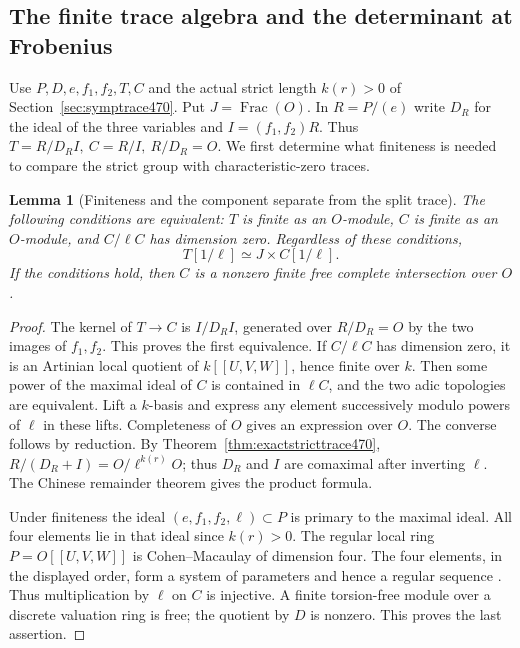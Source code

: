 \documentclass[a4paper,11pt]{article}
\newtheorem{lemma}[proposition]{Lemma}
\theoremstyle{definition}
\theoremstyle{remark}
\numberwithin{equation}{section}
\begin{document}
\subsection{The finite trace algebra and the determinant at Frobenius}
\label{sec:sympdet471}

Use \(P,D,e,f_1,f_2,T,C\) and the actual strict length \(k(r)>0\)
of Section~\ref{sec:symptrace470}. Put \(J=\operatorname{Frac}(O)\).
In \(R=P/(e)\) write \(D_R\) for the ideal of the three variables and
\(I=(f_1,f_2)R\). Thus \(T=R/D_R I,\ C=R/I,\ R/D_R=O\).
We first determine what finiteness is needed to compare the
strict group with characteristic-zero traces.

\begin{lemma}[Finiteness and the component separate from the split trace]\leavevmode
\label{lem:finitetrace471}
The following conditions are equivalent: \(T\) is finite as an
\(O\)-module, \(C\) is finite as an \(O\)-module, and \(C/\ell C\)
has dimension zero. Regardless of these conditions,
\[
        T[1/\ell]\simeq J\times C[1/\ell].
\]
If the conditions hold, then \(C\) is a nonzero finite free
complete intersection over \(O\).
\end{lemma}
\begin{proof}
The kernel of \(T\to C\) is \(I/D_R I\), generated over
\(R/D_R=O\) by the two images of \(f_1,f_2\). This proves the
first equivalence. If \(C/\ell C\) has dimension zero, it is an
Artinian local quotient of \(k[[U,V,W]]\), hence finite over \(k\).
Then some power of the maximal ideal of \(C\) is contained in
\(\ell C\), and the two adic topologies are equivalent. Lift a
\(k\)-basis and express any element successively modulo powers
of \(\ell\) in these lifts. Completeness of \(O\) gives an
expression over \(O\). The converse follows by reduction.
By Theorem~\ref{thm:exactstricttrace470},
\(R/(D_R+I)=O/\ell^{k(r)}O\); thus \(D_R\) and \(I\) are comaximal
after inverting \(\ell\). The Chinese remainder theorem gives
the product formula.

Under finiteness the ideal \((e,f_1,f_2,\ell)\subset P\) is
primary to the maximal ideal. All four elements lie in that ideal
since \(k(r)>0\). The regular local ring \(P=O[[U,V,W]]\) is
Cohen--Macaulay of dimension four. The four elements, in the
displayed order, form a system of parameters and hence a regular
sequence \cite{IX-VII-cm471}. Thus multiplication by \(\ell\) on \(C\)
is injective. A finite torsion-free module over a discrete valuation
ring is free; the quotient by \(D\) is nonzero. This proves the
last assertion.
\end{proof}
\end{document}
